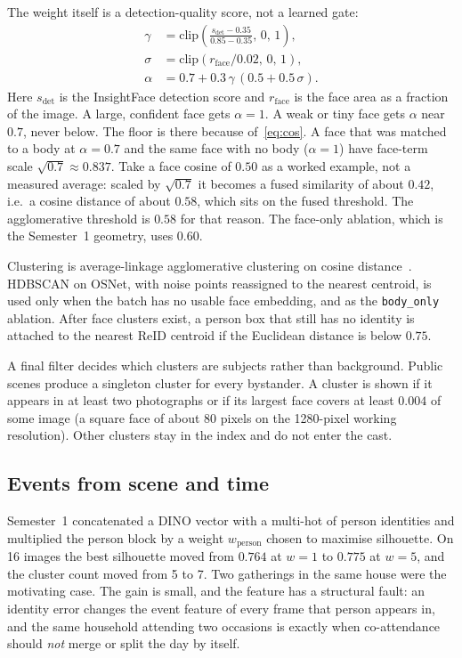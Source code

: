 \documentclass[conference]{IEEEtran}
\begin{document}
The weight itself is a detection-quality score, not a learned gate:
\begin{align}
\gamma &= \mathrm{clip}\!\left(\frac{s_{\det}-0.35}{0.85-0.35},\,0,\,1\right),\\
\sigma &= \mathrm{clip}(r_{\mathrm{face}}/0.02,\,0,\,1),\\
\alpha &= 0.7 + 0.3\,\gamma\,(0.5 + 0.5\,\sigma).
\label{eq:alpha}
\end{align}
Here $s_{\det}$ is the InsightFace detection score and $r_{\mathrm{face}}$ is
the face area as a fraction of the image. A large, confident face gets
$\alpha=1$. A weak or tiny face gets $\alpha$ near $0.7$, never below. The
floor is there because of~\eqref{eq:cos}. A face that was matched to a body at
$\alpha=0.7$ and the same face with no body ($\alpha=1$) have face-term scale
$\sqrt{0.7}\approx 0.837$. Take a face cosine of $0.50$ as a worked example,
not a measured average: scaled by $\sqrt{0.7}$ it becomes a fused similarity
of about $0.42$, i.e.\ a cosine distance of about $0.58$, which sits on the
fused threshold. The agglomerative threshold is $0.58$ for that reason. The
face-only ablation, which is the Semester~1 geometry, uses $0.60$.

Clustering is average-linkage agglomerative clustering on cosine
distance~\cite{pedregosa2011sklearn}. HDBSCAN on OSNet, with noise points
reassigned to the nearest centroid, is used only when the batch has no usable
face embedding, and as the \texttt{body\_only} ablation. After face clusters
exist, a person box that still has no identity is attached to the nearest ReID
centroid if the Euclidean distance is below $0.75$.

A final filter decides which clusters are subjects rather than background.
Public scenes produce a singleton cluster for every bystander. A cluster is
shown if it appears in at least two photographs or if its largest face covers
at least $0.004$ of some image (a square face of about 80 pixels on the
1280-pixel working resolution). Other clusters stay in the index and do not
enter the cast.

\subsection{Events from scene and time}
\label{sec:events}

Semester~1 concatenated a DINO vector with a multi-hot of person identities and
multiplied the person block by a weight $w_{\mathrm{person}}$ chosen to
maximise silhouette. On 16 images the best silhouette moved from $0.764$ at
$w=1$ to $0.775$ at $w=5$, and the cluster count moved from 5 to 7. Two
gatherings in the same house were the motivating case. The gain is small, and
the feature has a structural fault: an identity error changes the event
feature of every frame that person appears in, and the same household attending
two occasions is exactly when co-attendance should \emph{not} merge or split
the day by itself.
\end{document}
